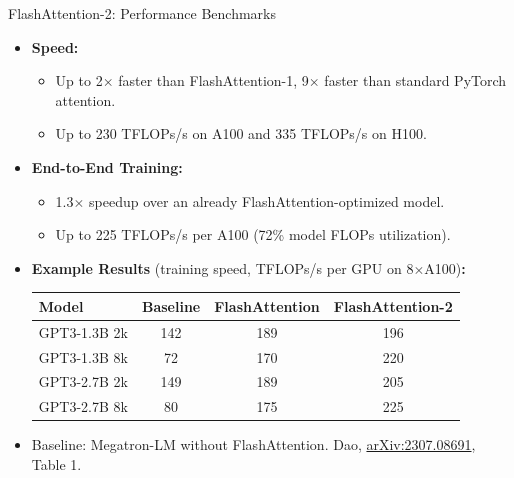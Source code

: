 \begin{frame}{FlashAttention-2: Performance Benchmarks}
    \begin{itemize}
        \item \textbf{Speed:}
        \begin{itemize}
            \item Up to 2$\times$ faster than FlashAttention-1, 9$\times$ faster than standard PyTorch attention.
            \item Up to 230 TFLOPs/s on A100 and 335 TFLOPs/s on H100.
        \end{itemize}
        \item \textbf{End-to-End Training:}
        \begin{itemize}
            \item 1.3$\times$ speedup over an already FlashAttention-optimized model.
            \item Up to 225 TFLOPs/s per A100 (72\% model FLOPs utilization).
        \end{itemize}
        \item \textbf{Example Results} (training speed, TFLOPs/s per GPU on 8$\times$A100)\textbf{:}
            \begin{tabular}{lccc}
                \toprule
                Model & Baseline & FlashAttention & FlashAttention-2 \\
                \midrule
                GPT3-1.3B 2k & 142 & 189 & 196 \\
                GPT3-1.3B 8k & 72 & 170 & 220 \\
                GPT3-2.7B 2k & 149 & 189 & 205 \\
                GPT3-2.7B 8k & 80 & 175 & 225 \\
                \bottomrule
            \end{tabular}
        \item[] {\footnotesize Baseline: Megatron-LM without FlashAttention. Dao, \href{https://arxiv.org/abs/2307.08691}{arXiv:2307.08691}, Table 1.}
    \end{itemize}
\end{frame}

